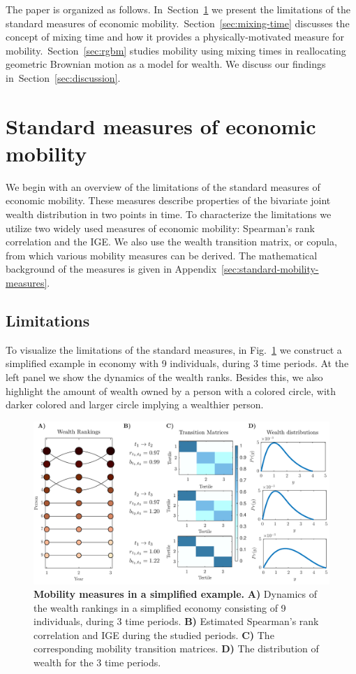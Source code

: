 \documentclass[11pt]{article}
\newcommand{\Sref}[1]{Section~\ref{sec:#1}}
\newcommand{\fref}[1]{Fig.~\ref{fig:#1}}
\numberwithin{equation}{section}
\begin{document}
The paper is organized as follows. In~\Sref{standard-masures} we present the limitations of the standard measures of economic mobility.~\Sref{mixing-time} discusses the concept of mixing time and how it provides a physically-motivated measure for mobility.~\Sref{rgbm} studies mobility using mixing times in reallocating geometric Brownian motion as a model for wealth. We discuss our findings in~\Sref{discussion}.

\section{Standard measures of economic mobility}\label{sec:standard-masures}


We begin with an overview of the limitations of the standard measures of economic mobility. These measures describe properties of the bivariate joint wealth distribution in two points in time. To characterize the limitations we utilize two widely used measures of economic mobility: Spearman's rank correlation and the IGE. We also use the wealth transition matrix, or copula, from which various mobility measures can be derived. The mathematical background of the measures is given in Appendix~\ref{sec:standard-mobility-measures}.


\subsection{Limitations}
To visualize the limitations of the standard measures, in \fref{standard-mobility-measures} we construct a simplified example in economy with 9 individuals, during 3 time periods. At the left panel we show the dynamics of the wealth ranks. Besides this, we also highlight the amount of wealth owned by a person with a colored circle, with darker colored and larger circle implying a wealthier person.
%
\begin{figure}[!htb]
\centering
\includegraphics[width=1.0\textwidth]{figs/fig_mobility_measures.pdf}
\caption{\textbf{Mobility measures in a simplified example.} \textbf{A)} Dynamics of the wealth rankings in a simplified economy consisting of 9 individuals, during 3 time periods. \textbf{B)} Estimated Spearman's rank correlation and IGE during the studied periods. \textbf{C)} The corresponding mobility transition matrices. \textbf{D)} The distribution of wealth for the 3 time periods.
\label{fig:standard-mobility-measures}}
\end{figure}
\end{document}
